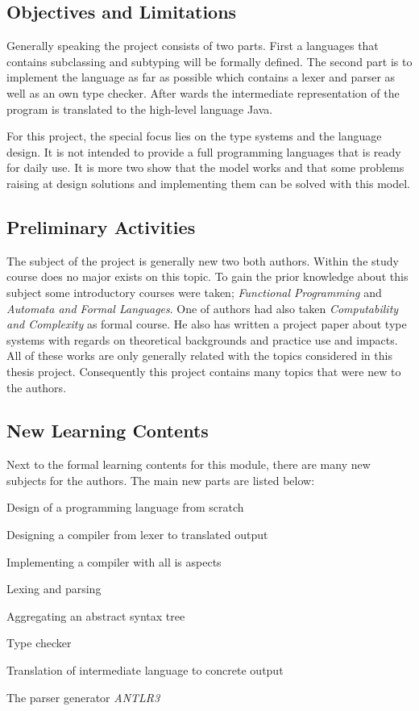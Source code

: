 \subsection{Objectives and Limitations}
Generally speaking the project consists of two parts. First a languages
that contains subclassing and subtyping will be formally defined. The
second part is to implement the language as far as possible which contains
a lexer and parser as well as an own type checker. After wards the
intermediate representation of the program is translated to the high-level
language Java.

For this project, the special focus lies on the type systems and the language
design. It is not intended to provide a full programming languages that is
ready for daily use. It is more two show that the model works and that some
problems raising at design solutions and implementing them can be solved
with this model.

\subsection{Preliminary Activities}
The subject of the project is generally new two both authors. Within
the study course does no major exists on this topic. To gain the prior
knowledge about this subject some introductory courses were taken;
\emph{Functional Programming} and \emph{Automata and Formal Languages}.
One of authors had also taken \emph{Computability and Complexity} as
formal course. He also has written a project paper about type systems
with regards on theoretical backgrounds and practice use and impacts. All
of these works are only generally related with the topics considered in
this thesis project. Consequently this project contains many topics that
were new to the authors.

\subsection{New Learning Contents}
Next to the formal learning contents for this module, there are many
new subjects for the authors. The main new parts are listed below:

\squishlist
	\item Design of a programming language from scratch
	\item Designing a compiler from lexer to translated output
	\item Implementing a compiler with all is aspects
	\squishlist
		\item Lexing and parsing
		\item Aggregating an abstract syntax tree
		\item Type checker
		\item Translation of intermediate language to concrete output
	\squishend
	\item The parser generator \emph{ANTLR3}
\squishend

